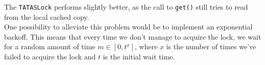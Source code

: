 \documentclass[main]{subfiles}
\begin{document}
The \texttt{TATASLock} performs slightly better, as the call to \texttt{get()} still tries to read from the local cached copy.\\[3mm]
One possibility to alleviate this problem would be to implement an exponential backoff. This means that every time we don't manage to acquire the lock, we wait for a random amount of time $m \in [0,t^x]$, where $x$ is the number of times we've failed to acquire the lock and $t$ is the initial wait time.

\newpage

\end{document}
